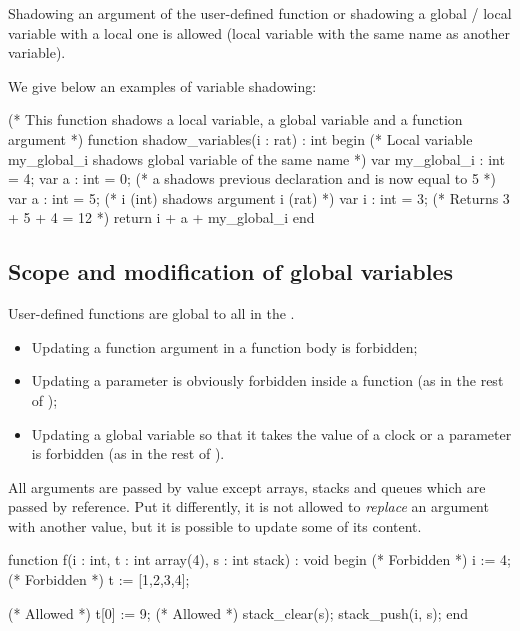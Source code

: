 Shadowing an argument of the user-defined function or shadowing a global / local variable with a local one is allowed (local variable with the same name as another variable).


\begin{example}
We give below an examples of variable shadowing:

\begin{IMITATORmodel}
(* This function shadows a local variable, a global variable and a function argument *)
function shadow_variables(i : rat) : int
begin
	(* Local variable my_global_i shadows global variable of the same name *)
	var my_global_i : int = 4;
	var a : int = 0;
	(* a shadows previous declaration and is now equal to 5 *)
	var a : int = 5;
	(* i (int) shadows argument i (rat) *)
	var i : int = 3;
	(* Returns 3 + 5 + 4 = 12 *)
	return i + a + my_global_i
end
\end{IMITATORmodel}
\end{example}



\subsection{Scope and modification of global variables}

User-defined functions are global to all \IPTA{} in the \NIPTA{}.

\begin{itemize}
	\item Updating a function argument in a function body is forbidden;
	\item Updating a parameter is obviously forbidden inside a function (as in the rest of \imitator{});
	\item Updating a global variable so that it takes the value of a clock or a parameter is forbidden (as in the rest of \imitator{}).
\end{itemize}

All arguments are passed by value except arrays, stacks and queues which are passed by reference.
Put it differently, it is not allowed to \emph{replace} an argument with another value, but it is possible to update some of its content.

\begin{IMITATORmodel}
function f(i : int, t : int array(4), s : int stack) : void
begin
	(* Forbidden *)
 	i := 4;
	(* Forbidden *)
 	t := [1,2,3,4];

	(* Allowed *)
	t[0] := 9;
	(* Allowed *)
	stack_clear(s);
	stack_push(i, s);
end
\end{IMITATORmodel}




